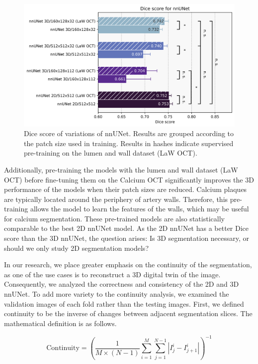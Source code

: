 \documentclass[a4paper,11pt,oneside]{report}
\begin{document}
\begin{figure}[h]
    \centering
    \includegraphics[width=0.8\linewidth]{figures/result_nnunet_results.png}
    \caption{Dice score of variations of nnUNet. Results are grouped according to the patch size used in training. Results in hashes indicate supervised pre-training on the lumen and wall dataset (LaW OCT). 
    }
    \label{fig:nnunet-results}
\end{figure}

Additionally, pre-training the models with the lumen and wall dataset (LaW OCT) before fine-tuning them on the Calcium OCT significantly improves the 3D performance of the models when their patch sizes are reduced. Calcium plaques are typically located around the periphery of artery walls. Therefore, this pre-training allows the model to learn the features of the walls, which may be useful for calcium segmentation. These pre-trained models are also statistically comparable to the best 2D nnUNet model. As the 2D nnUNet has a better Dice score than the 3D nnUNet, the question arises: Is 3D segmentation necessary, or should we only study 2D segmentation models?

In our research, we place greater emphasis on the continuity of the segmentation, as one of the use cases is to reconstruct a 3D digital twin of the image. Consequently, we analyzed the correctness and consistency of the 2D and 3D nnUNet. To add more variety to the continuity analysis, we examined the validation images of each fold rather than the testing images. First, we defined continuity to be the inverse of changes between adjacent segmentation slices. The mathematical definition is as follows.

\begin{equation}
\text{Continuity} = \left(\frac{1}{M\times (N - 1)}\sum_{i = 1}^{M}\sum_{j = 1}^{N-1} \left| I_{j}^{i} - I_{j+1}^{i}\right|\right)^{-1}
\end{equation}
\end{document}

